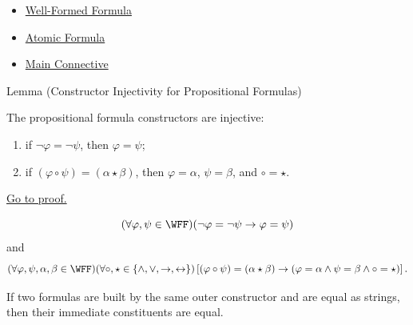 \begin{dependencies}
\begin{itemize}
  \item \hyperref[def:well-formed-formula]{Well-Formed Formula}
  \item \hyperref[def:atomic-formula-propositional-logic]{Atomic Formula}
  \item \hyperref[def:main-connective-propositional-logic]{Main Connective}
\end{itemize}
\end{dependencies}
\begin{lemmabox}{Lemma (Constructor Injectivity for Propositional Formulas)}
\begin{lemma}
\label{lem:constructor-injectivity-propositional-formulas}
The propositional formula constructors are injective:
\begin{enumerate}
\item if \(\neg\varphi=\neg\psi\), then \(\varphi=\psi\);
\item if \((\varphi\circ\psi)=(\alpha\star\beta)\), then \(\varphi=\alpha\), \(\psi=\beta\), and \(\circ=\star\).
\end{enumerate}

\noindent\hyperref[prf:constructor-injectivity-propositional-formulas]{Go to proof.}
\end{lemma}
\end{lemmabox}
\begin{remark*}
\[
(\forall\varphi,\psi\in\WFF)
(\neg\varphi=\neg\psi\to\varphi=\psi)
\]
and
\[
(\forall\varphi,\psi,\alpha,\beta\in\WFF)
(\forall\circ,\star\in\{\land,\lor,\to,\leftrightarrow\})
\left[
(\varphi\circ\psi)=(\alpha\star\beta)
\to
(\varphi=\alpha\land\psi=\beta\land\circ=\star)
\right].
\]
\end{remark*}




\begin{remark*}[Interpretation]
If two formulas are built by the same outer constructor and are equal as strings, then their immediate constituents are equal.
\end{remark*}

